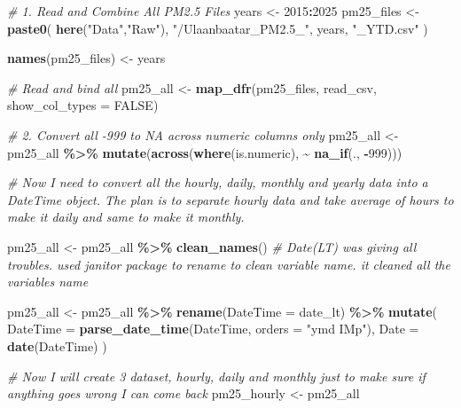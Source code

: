 \documentclass[
]{article}
\newenvironment{Shaded}{\begin{snugshade}}{\end{snugshade}}
\newcommand{\AttributeTok}[1]{\textcolor[rgb]{0.13,0.29,0.53}{#1}}
\newcommand{\CommentTok}[1]{\textcolor[rgb]{0.56,0.35,0.01}{\textit{#1}}}
\newcommand{\ConstantTok}[1]{\textcolor[rgb]{0.56,0.35,0.01}{#1}}
\newcommand{\DecValTok}[1]{\textcolor[rgb]{0.00,0.00,0.81}{#1}}
\newcommand{\FunctionTok}[1]{\textcolor[rgb]{0.13,0.29,0.53}{\textbf{#1}}}
\newcommand{\NormalTok}[1]{#1}
\newcommand{\OtherTok}[1]{\textcolor[rgb]{0.56,0.35,0.01}{#1}}
\newcommand{\SpecialCharTok}[1]{\textcolor[rgb]{0.81,0.36,0.00}{\textbf{#1}}}
\newcommand{\StringTok}[1]{\textcolor[rgb]{0.31,0.60,0.02}{#1}}
\begin{document}
\begin{Shaded}
\begin{Highlighting}[]
\CommentTok{\# 1. Read and Combine All PM2.5 Files}
\NormalTok{years }\OtherTok{\textless{}{-}} \DecValTok{2015}\SpecialCharTok{:}\DecValTok{2025}
\NormalTok{pm25\_files }\OtherTok{\textless{}{-}} \FunctionTok{paste0}\NormalTok{(}
  \FunctionTok{here}\NormalTok{(}\StringTok{"Data"}\NormalTok{,}\StringTok{"Raw"}\NormalTok{), }
  \StringTok{"/Ulaanbaatar\_PM2.5\_"}\NormalTok{, years, }\StringTok{"\_YTD.csv"}
\NormalTok{)}

\FunctionTok{names}\NormalTok{(pm25\_files) }\OtherTok{\textless{}{-}}\NormalTok{ years}

\CommentTok{\# Read and bind all}
\NormalTok{pm25\_all }\OtherTok{\textless{}{-}} \FunctionTok{map\_dfr}\NormalTok{(pm25\_files, read\_csv, }\AttributeTok{show\_col\_types =} \ConstantTok{FALSE}\NormalTok{)}


\CommentTok{\# 2. Convert all {-}999 to NA across numeric columns only}
\NormalTok{pm25\_all }\OtherTok{\textless{}{-}}\NormalTok{ pm25\_all }\SpecialCharTok{\%\textgreater{}\%}
  \FunctionTok{mutate}\NormalTok{(}\FunctionTok{across}\NormalTok{(}\FunctionTok{where}\NormalTok{(is.numeric), }\SpecialCharTok{\textasciitilde{}} \FunctionTok{na\_if}\NormalTok{(., }\SpecialCharTok{{-}}\DecValTok{999}\NormalTok{)))}


\CommentTok{\# Now I need to convert all the hourly, daily, monthly and yearly data into a DateTime object. The plan is to separate hourly data and take average of hours to make it daily and same to make it monthly. }

\NormalTok{pm25\_all }\OtherTok{\textless{}{-}}\NormalTok{ pm25\_all }\SpecialCharTok{\%\textgreater{}\%}
  \FunctionTok{clean\_names}\NormalTok{() }\CommentTok{\# Date(LT) was giving all troubles. used janitor package to rename to clean                      variable name. it cleaned all the variables name}

\NormalTok{pm25\_all }\OtherTok{\textless{}{-}}\NormalTok{ pm25\_all }\SpecialCharTok{\%\textgreater{}\%}
  \FunctionTok{rename}\NormalTok{(}\AttributeTok{DateTime =}\NormalTok{ date\_lt) }\SpecialCharTok{\%\textgreater{}\%}  
  \FunctionTok{mutate}\NormalTok{(}
    \AttributeTok{DateTime =} \FunctionTok{parse\_date\_time}\NormalTok{(DateTime, }\AttributeTok{orders =} \StringTok{"ymd IMp"}\NormalTok{),}
    \AttributeTok{Date     =} \FunctionTok{date}\NormalTok{(DateTime)}
\NormalTok{  )}

\CommentTok{\# Now I will create 3 dataset, hourly, daily and monthly just to make sure if anything goes wrong I can come back}
\NormalTok{pm25\_hourly }\OtherTok{\textless{}{-}}\NormalTok{ pm25\_all}


\end{Highlighting}
\end{Shaded}
\end{document}
